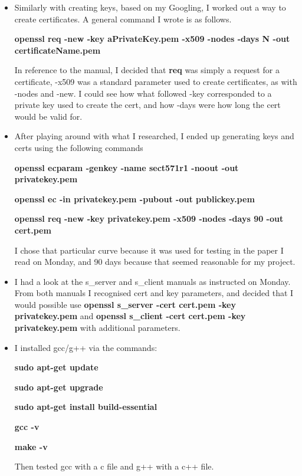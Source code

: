 \documentclass[a4paper, 10pt, envcountsect, runningheads]{article}
\begin{document}
\begin{itemize}
\item Similarly with creating keys, based on my Googling, I worked out a way to create certificates. A general command I wrote is as follows.

\color{DarkOrchid}\textbf{openssl req -new -key aPrivateKey.pem -x509 -nodes -days N -out certificateName.pem}

\color{black} In reference to the manual, I decided that \textbf{req} was simply a request for a certificate, -x509 was a standard parameter used to create certificates, as with -nodes and -new. I could see how what followed -key corresponded to a private key used to create the cert, and how -days were how long the cert would be valid for.
\item After playing around with what I researched, I ended up generating keys and certs using the following commands

\color{DarkOrchid}\textbf{openssl ecparam -genkey -name sect571r1 -noout -out privatekey.pem}

\textbf{openssl ec -in privatekey.pem -pubout -out publickey.pem}

\textbf{openssl req -new -key privatekey.pem -x509 -nodes -days 90 -out cert.pem}

\color{black} I chose that particular curve because it was used for testing in the paper I read on Monday, and 90 days because that seemed reasonable for my project. 
\item I had a look at the s\_server and s\_client manuals as instructed on Monday. From both manuals I recognised cert and key parameters, and decided that I would possible use \textbf{openssl s\_server -cert cert.pem -key privatekey.pem} and \textbf{openssl s\_client -cert cert.pem -key privatekey.pem} with additional parameters. 
\item I installed gcc/g++ via the commands:

\textbf{sudo apt-get update}

\textbf{sudo apt-get upgrade}

\textbf{sudo apt-get install build-essential}

\textbf{gcc -v}

\textbf{make -v}

Then tested gcc with a c file and g++ with a c++ file. 

\end{itemize}
\end{document}
